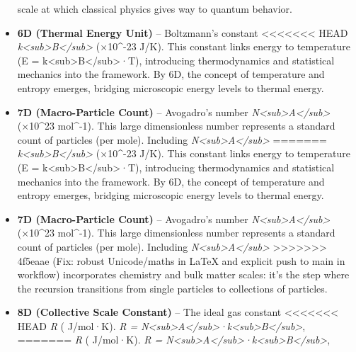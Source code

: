 \documentclass[]{article}
\begin{document}
\begin{itemize}
  scale at which classical physics gives way to quantum behavior.
\item
  \textbf{6D (Thermal Energy Unit)} -- Boltzmann's constant
<<<<<<< HEAD
  \emph{k\textless sub\textgreater B\textless/sub\textgreater{}} (×10\^{}-23 J/K)\hspace{0pt}. This constant links energy to
  temperature (E =
  k\textless sub\textgreater B\textless/sub\textgreater·T), introducing
  thermodynamics and statistical mechanics into the framework. By 6D,
  the concept of temperature and entropy emerges, bridging microscopic
  energy levels to thermal energy.
\item
  \textbf{7D (Macro-Particle Count)} -- Avogadro's number
  \emph{N\textless sub\textgreater A\textless/sub\textgreater{}} (×10\^{}23 mol\^{}-1)\hspace{0pt}. This large dimensionless number
  represents a standard count of particles (per mole). Including
  \emph{N\textless sub\textgreater A\textless/sub\textgreater{}}
=======
  \emph{k\textless{}sub\textgreater{}B\textless{}/sub\textgreater{}} (×10\^{}-23 J/K)​. This constant links energy to temperature (E
  = k\textless{}sub\textgreater{}B\textless{}/sub\textgreater{}·T),
  introducing thermodynamics and statistical mechanics into the
  framework. By 6D, the concept of temperature and entropy emerges,
  bridging microscopic energy levels to thermal energy.
\item
  \textbf{7D (Macro-Particle Count)} -- Avogadro's number
  \emph{N\textless{}sub\textgreater{}A\textless{}/sub\textgreater{}} (×10\^{}23 mol\^{}-1)​. This large dimensionless number represents
  a standard count of particles (per mole). Including
  \emph{N\textless{}sub\textgreater{}A\textless{}/sub\textgreater{}}
>>>>>>> 4f5eaae (Fix: robust Unicode/maths in LaTeX and explicit push to main in workflow)
  incorporates chemistry and bulk matter scales: it's the step where the
  recursion transitions from single particles to collections of
  particles.
\item
  \textbf{8D (Collective Scale Constant)} -- The ideal gas constant
<<<<<<< HEAD
  \emph{R} ( J/mol·K)\hspace{0pt}. \emph{R =
  N\textless sub\textgreater A\textless/sub\textgreater·k\textless sub\textgreater B\textless/sub\textgreater{}},
=======
  \emph{R} ( J/mol·K)​. \emph{R =
  N\textless{}sub\textgreater{}A\textless{}/sub\textgreater{}·k\textless{}sub\textgreater{}B\textless{}/sub\textgreater{}},

\end{itemize}
\end{document}

